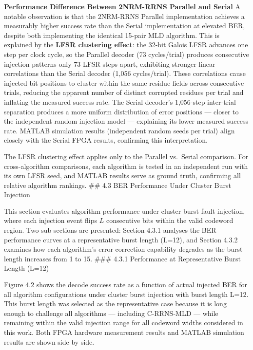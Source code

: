 \textbf{Performance Difference Between 2NRM-RRNS Parallel and Serial} A
notable observation is that the 2NRM-RRNS Parallel implementation
achieves a measurably higher success rate than the Serial implementation
at elevated BER, despite both implementing the identical 15-pair MLD
algorithm. This is explained by the \textbf{LFSR clustering effect}: the
32-bit Galois LFSR advances one step per clock cycle, so the Parallel
decoder (73 cycles/trial) produces consecutive injection patterns only
73 LFSR steps apart, exhibiting stronger linear correlations than the
Serial decoder (1,056 cycles/trial). These correlations cause injected
bit positions to cluster within the same residue fields across
consecutive trials, reducing the apparent number of distinct corrupted
residues per trial and inflating the measured success rate. The Serial
decoder's 1,056-step inter-trial separation produces a more uniform
distribution of error positions --- closer to the independent random
injection model --- explaining its lower measured success rate. MATLAB
simulation results (independent random seeds per trial) align closely
with the Serial FPGA results, confirming this interpretation.

The LFSR clustering effect applies only to the Parallel vs.~Serial
comparison. For cross-algorithm comparisons, each algorithm is tested in
an independent run with its own LFSR seed, and MATLAB results serve as
ground truth, confirming all relative algorithm rankings. \#\# 4.3 BER
Performance Under Cluster Burst Injection

This section evaluates algorithm performance under cluster burst fault
injection, where each injection event flips \(L\) consecutive bits
within the valid codeword region. Two sub-sections are presented:
Section 4.3.1 analyses the BER performance curves at a representative
burst length (L=12), and Section 4.3.2 examines how each algorithm's
error correction capability degrades as the burst length increases from
1 to 15. \#\#\# 4.3.1 Performance at Representative Burst Length (L=12)

Figure 4.2 shows the decode success rate as a function of actual
injected BER for all algorithm configurations under cluster burst
injection with burst length L=12. This burst length was selected as the
representative case because it is long enough to challenge all
algorithms --- including C-RRNS-MLD --- while remaining within the valid
injection range for all codeword widths considered in this work. Both
FPGA hardware measurement results and MATLAB simulation results are
shown side by side.

